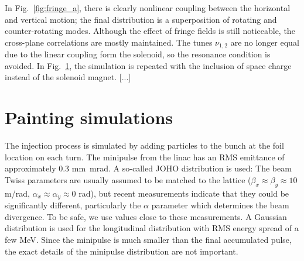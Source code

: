 %
In Fig.~\ref{fig:fringe_a}, there is clearly nonlinear coupling between the horizontal and vertical motion; the final distribution is a superposition of rotating and counter-rotating modes. Although the effect of fringe fields is still noticeable, the cross-plane correlations are mostly maintained. The tunes $\nu_{1, 2}$ are no longer equal due to the linear coupling form the solenoid, so the resonance condition is avoided. In Fig.~\ref{}, the simulation is repeated with the inclusion of space charge instead of the solenoid magnet. [...] 


\section{Painting simulations}

The injection process is simulated by adding particles to the bunch at the foil location on each turn. The minipulse from the linac has an RMS emittance of approximately 0.3 mm~mrad. A so-called JOHO distribution is used:
%
%
The beam Twiss parameters are usually assumed to be matched to the lattice ($\beta_x \approx \beta_y \approx 10$ m/rad, $\alpha_x \approx \alpha_y \approx 0$ rad), but recent measurements indicate that they could be significantly different, particularly the $\alpha$ parameter which determines the beam divergence. To be safe, we use values close to these measurements. A Gaussian distribution is used for the longitudinal distribution with RMS energy spread of a few MeV. Since the minipulse is much smaller than the final accumulated pulse, the exact details of the minipulse distribution are not important.


